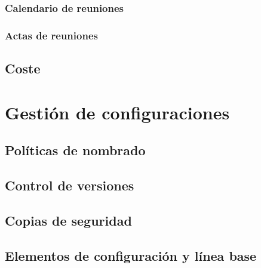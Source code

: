 \documentclass[10pt,spanish]{article}
\let\stdsection\section
\renewcommand\section{\newpage\stdsection}
\begin{document}
\subsubsection{Calendario de reuniones}


\subsubsection{Actas de reuniones}


\subsection{Coste}\label{subsec:coste}



\section{Gestión de configuraciones}


\subsection{Políticas de nombrado}


\subsection{Control de versiones}


\subsection{Copias de seguridad}


\subsection{Elementos de configuración y línea base}

\end{document}
